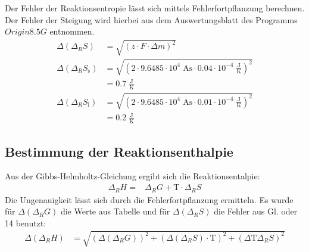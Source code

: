 \documentclass[12pt,a4paper,titlepage,headinclude,bibtotoc]{scrartcl}
\begin{document}
Der Fehler der Reaktionsentropie lässt sich mittels Fehlerfortpflanzung berechnen. Der Fehler der Steigung wird hierbei aus dem Auswertungsblatt des Programms $Origin 8.5 G$ entnommen. 
\begin{align}
\Delta(\Delta_R  S)&= \sqrt{(z\cdot F \cdot \Delta m)^2}\\
\Delta(\Delta_R  S_{\text{s}})&= \sqrt{(2\cdot 9.6485 \cdot 10^4\;\text{As} \cdot 0.04 \cdot 10^{-4}\;\frac{\text{J}}{\text{K}})^2}\\
&= 0.7 \;\frac{\text{J}}{\text{K}}\\
\Delta(\Delta_R  S_{\text{l}})&= \sqrt{(2\cdot 9.6485 \cdot 10^4\;\text{As} \cdot 0.01\cdot 10^{-4}\;\frac{\text{J}}{\text{K}})^2}\\
&= 0.2\;\frac{\text{J}}{\text{K}}
\end{align}
\subsection{Bestimmung der Reaktionsenthalpie}
Aus der Gibbs-Helmholtz-Gleichung ergibt sich die Reaktionsentalpie:
\begin{align}
\Delta_R H=& \Delta_R G +\text{T} \cdot \Delta_R S
\end{align}
Die Ungenauigkeit lässt sich durch die Fehlerfortpflanzung ermitteln. Es wurde für $\Delta(\Delta_R G)$ die Werte aus Tabelle und für $\Delta(\Delta_R S)$ die Fehler aus Gl. oder 14 benutzt:
\begin{align}
\Delta(\Delta_R  H)&= \sqrt{(\Delta(\Delta_R G))^2 + (\Delta(\Delta_R S) \cdot \text{T})^2 +(\Delta\text{T} \Delta_R S)^2}\\
\end{align}
\end{document}
